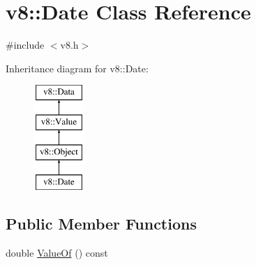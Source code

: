 \hypertarget{classv8_1_1Date}{}\section{v8\+:\+:Date Class Reference}
\label{classv8_1_1Date}


{\ttfamily \#include $<$v8.\+h$>$}

Inheritance diagram for v8\+:\+:Date\+:\begin{figure}[H]
\begin{center}
\leavevmode
\includegraphics[height=4.000000cm]{classv8_1_1Date}
\end{center}
\end{figure}
\subsection*{Public Member Functions}
\begin{DoxyCompactItemize}
\item 
double \hyperlink{classv8_1_1Date_a06800409271fe5fa74202e0fd1ec8e87}{Value\+Of} () const 
\end{DoxyCompactItemize}
